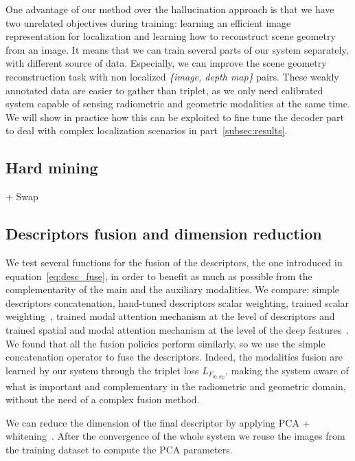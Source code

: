 One advantage of our method over the hallucination approach is that we have two unrelated objectives during training: learning an efficient image representation for localization and learning how to reconstruct scene geometry from an image. It means that we can train several parts of our system separately, with different source of data. Especially, we can improve the scene geometry reconstruction task with non localized \textit{\{image, depth map\}} pairs. These weakly annotated data are easier to gather than triplet, as we only need calibrated system capable of sensing radiometric and geometric modalities at the same time. We will show in practice how this can be exploited to fine tune the decoder part to deal with complex localization scenarios in part~\ref{subsec:results}.

\subsection{Hard mining}
\label{subsec:hard_minning}

+ Swap

\subsection{Descriptors fusion and dimension reduction}
\label{subsec:fuse_desc}
We test several functions for the fusion of the descriptors, the one introduced in equation~\ref{eq:desc_fuse}, in order to benefit as much as possible from the complementarity of the main and the auxiliary modalities. We compare: simple descriptors concatenation, hand-tuned descriptors scalar weighting, trained scalar weighting~\cite{Sizikova2016}, trained modal attention mechanism at the level of descriptors and trained spatial and modal attention mechanism at the level of the deep features~\cite{Seymour2018}. We found that all the fusion policies perform similarly, so we use the simple concatenation operator to fuse the descriptors. Indeed, the modalities fusion are learned by our system through the triplet loss $L_{F_{\theta_{I}, \theta_{D}}}$, making the system aware of what is important and complementary in the radiometric and geometric domain, without the need of a complex fusion method.

We can reduce the dimension of the final descriptor by applying PCA + whitening~\citep{Arandjelovic2017, Radenovic2016, Radenovic2017, Gordo2017}. After the convergence of the whole system we reuse the images from the training dataset to compute the PCA parameters.
